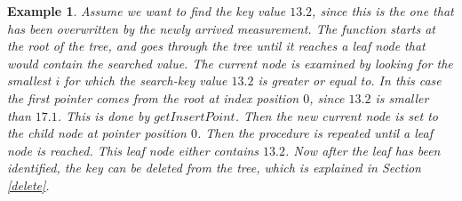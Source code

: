 \documentclass[abstracton,12pt]{scrreprt}
\newtheorem{example}{Example}
\begin{document}
\begin{example}
	Assume we want to find the key value $13.2$, since this is the one that has been overwritten by the newly arrived measurement. The function starts at the root of the tree, and goes through the tree until it reaches a leaf node that would contain the searched value. The current node is examined by looking for the smallest $i$ for which the search-key value $13.2$ is greater or equal to. In this case the first pointer comes from the root at index position $0$, since $13.2$ is smaller than $17.1$. This is done by $getInsertPoint$. Then the new current node is set to the child node at pointer position $0$. Then the procedure is repeated until a leaf node is reached. This leaf node either contains $13.2$. Now after the leaf has been identified, the key can be deleted from the tree, which is explained in Section \ref{delete}.
\end{example} 
\end{document}
